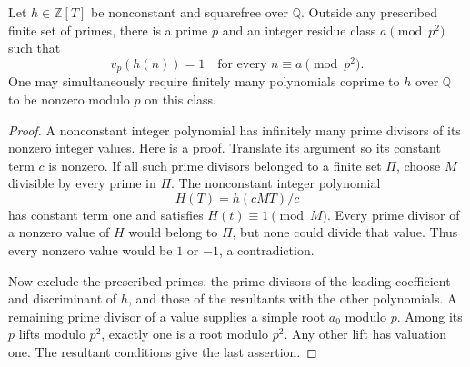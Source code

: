 \begin{lemma}\label{lem:simple-prime-values}
Let $h\in\mathbb Z[T]$ be nonconstant and squarefree over $\mathbb Q$.
Outside any prescribed finite set of primes, there is a prime $p$ and
an integer residue class $a\pmod{p^2}$ such that
\[
                        v_p(h(n))=1
              \quad\text{for every }n\equiv a\pmod{p^2}.
\]
One may simultaneously require finitely many polynomials coprime to
$h$ over $\mathbb Q$ to be nonzero modulo $p$ on this class.
\end{lemma}
\begin{proof}
A nonconstant integer polynomial has infinitely many prime divisors
of its nonzero integer values.  Here is a proof.  Translate its
argument so its constant term $c$ is nonzero.  If all such prime
divisors belonged to a finite set $\Pi$, choose $M$ divisible by
every prime in $\Pi$.  The nonconstant integer polynomial
\[
                         H(T)=h(cMT)/c
\]
has constant term one and satisfies $H(t)\equiv1\pmod M$.
Every prime divisor of a nonzero value of $H$ would belong to $\Pi$,
but none could divide that value.  Thus every nonzero value would
be $1$ or $-1$, a contradiction.

Now exclude the prescribed primes, the prime divisors of the leading
coefficient and discriminant of $h$, and those of the resultants with
the other polynomials.  A remaining prime divisor of a value supplies
a simple root $a_0$ modulo $p$.  Among its $p$ lifts modulo $p^2$,
exactly one is a root modulo $p^2$.  Any other lift has valuation one.
The resultant conditions give the last assertion.
\end{proof}

